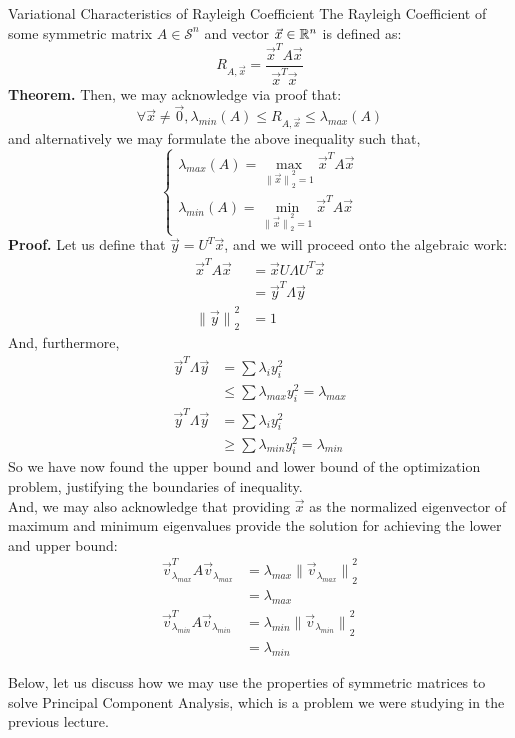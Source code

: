\begin{ln-theorem}{Variational Characteristics of Rayleigh Coefficient}{}
    The Rayleigh Coefficient of some symmetric matrix $A \in \mathcal{S}^n$ and vector $\vec{x} \in \mathbb{R}^n$ is defined as:
    \[
        R_{A, \vec{x}} = \frac{\vec{x}^T A \vec{x}}{\vec{x}^T \vec{x}}
    \]
    \textbf{Theorem.}
    Then, we may acknowledge via proof that:
    \[
        \forall \vec{x} \neq \vec{0}, \lambda_{min}(A) \leq R_{A, \vec{x}} \leq \lambda_{max}(A)
    \]
    and alternatively we may formulate the above inequality such that,
    \[
        \begin{cases}
            \lambda_{max}(A) = \max_{{\lVert \vec{x} \rVert}_2^2 = 1}\vec{x}^T A \vec{x} \\
            \lambda_{min}(A) = \min_{{\lVert \vec{x} \rVert}_2^2 = 1}\vec{x}^T A \vec{x}
        \end{cases}
    \]
    \tcblower
    \textbf{Proof.}
    Let us define that $\vec{y} = U^T \vec{x}$, and we will proceed onto the algebraic work:
    \begin{align*}
        \vec{x}^T A \vec{x}
        &= \vec{x} U \Lambda U^T \vec{x} \\
        &= \vec{y}^T \Lambda \vec{y} \\
        {\lVert \vec{y} \rVert}_2^2 &= 1
    \end{align*}
    And, furthermore,
    \begin{align*}
        \vec{y}^T \Lambda \vec{y}
        &= \sum \lambda_i y_i^2 \\
        &\leq \sum \lambda_{max} y_i^2 = \lambda_{max} \\
        \vec{y}^T \Lambda \vec{y}
        &= \sum \lambda_i y_i^2 \\
        &\geq \sum \lambda_{min} y_i^2 = \lambda_{min}
    \end{align*}
    So we have now found the upper bound and lower bound of the optimization problem, justifying the boundaries of inequality. \\
    And, we may also acknowledge that providing $\vec{x}$ as the normalized eigenvector of maximum and minimum eigenvalues provide the solution for achieving the lower and upper bound:
    \begin{align*}
        \vec{v}_{\lambda_{max}}^T A \vec{v}_{\lambda_{max}}
        &= \lambda_{max} {\lVert \vec{v}_{\lambda_{max}} \rVert}_2^2 \\
        &= \lambda_{max} \\
        \vec{v}_{\lambda_{min}}^T A \vec{v}_{\lambda_{min}}
        &= \lambda_{min} {\lVert \vec{v}_{\lambda_{min}} \rVert}_2^2 \\
        &= \lambda_{min}
    \end{align*}
\end{ln-theorem}
Below, let us discuss how we may use the properties of symmetric matrices to solve Principal Component Analysis, which is a problem we were studying in the previous lecture.

